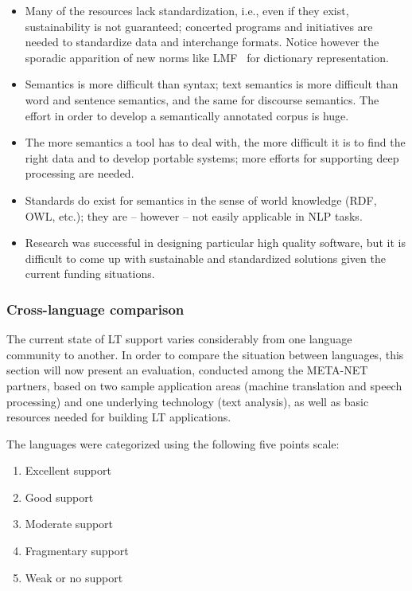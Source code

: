 \begin{multicols}{2}
\begin{itemize}
\item Many of the resources lack standardization, i.e., even if they
  exist, sustainability is not guaranteed; concerted programs and
  initiatives are needed to standardize data and interchange
  formats. Notice however the sporadic apparition of new norms like
  LMF~\cite{LMF} for dictionary representation.

\item Semantics is more difficult than syntax; text semantics is more
difficult than word and sentence semantics, and the same for discourse
semantics. The effort in order to develop a semantically annotated
corpus is huge.

\item The more semantics a tool has to deal with, the more difficult it is
to find the right data and to develop portable systems; more efforts
for supporting deep processing are needed.

\item Standards do exist for semantics in the sense of world knowledge (RDF,
OWL, etc.); they are – however – not easily applicable in NLP tasks.

\item Research was successful in designing particular high quality software,
but it is difficult to come up with sustainable and standardized
solutions given the current funding situations.
\end{itemize}

\subsubsection{Cross-language comparison}

The current state of LT support varies considerably from one language
community to another. In order to compare the situation between
languages, this section will now present an evaluation, conducted
among the META-NET partners, based on two sample application areas
(machine translation and speech processing) and one underlying
technology (text analysis), as well as basic resources needed for
building LT applications.

The languages were categorized using the following five points scale:
\begin{enumerate}
\item Excellent support
\item Good support
\item Moderate support
\item Fragmentary support
\item Weak or no support
\end{enumerate}


\end{multicols}
